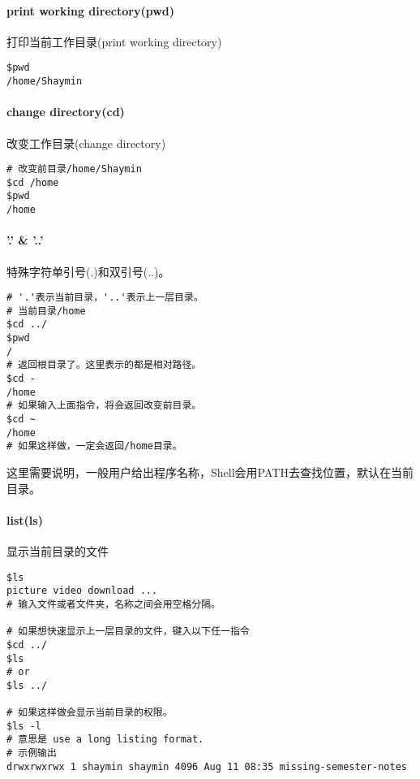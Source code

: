 \documentclass[
]{article}
\begin{document}
\hypertarget{print-working-directorypwd}{%
\paragraph{print working
directory(pwd)}\label{print-working-directorypwd}}

打印当前工作目录(print working directory)

\begin{verbatim}
$pwd
/home/Shaymin
\end{verbatim}

\hypertarget{change-directorycd}{%
\paragraph{change directory(cd)}\label{change-directorycd}}

改变工作目录(change directory)

\begin{verbatim}
# 改变前目录/home/Shaymin
$cd /home
$pwd
/home
\end{verbatim}

\hypertarget{--}{%
\paragraph{'.' \& '..'}\label{--}}

特殊字符单引号(.)和双引号(..)。

\begin{verbatim}
# '.'表示当前目录，'..'表示上一层目录。
# 当前目录/home
$cd ../
$pwd
/
# 返回根目录了。这里表示的都是相对路径。
$cd -
/home
# 如果输入上面指令，将会返回改变前目录。
$cd ~
/home
# 如果这样做，一定会返回/home目录。
\end{verbatim}

这里需要说明，一般用户给出程序名称，Shell会用PATH去查找位置，默认在当前目录。

\hypertarget{listls}{%
\paragraph{\texorpdfstring{\textbf{list(ls)}}{list(ls)}}\label{listls}}

显示当前目录的文件

\begin{verbatim}
$ls
picture video download ...
# 输入文件或者文件夹，名称之间会用空格分隔。

# 如果想快速显示上一层目录的文件，键入以下任一指令
$cd ../
$ls
# or
$ls ../

# 如果这样做会显示当前目录的权限。
$ls -l
# 意思是 use a long listing format.
# 示例输出
drwxrwxrwx 1 shaymin shaymin 4096 Aug 11 08:35 missing-semester-notes
\end{verbatim}
\end{document}
